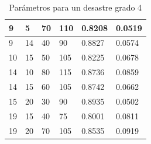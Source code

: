 \documentclass[letter, 10pt]{article}
\begin{document}
\begin{table}[H]
\begin{tabular}{|l|l|l|l|l|l|}
9 & 5 & 70 & 110 & 0.8208 & 0.0519 \\ \hline
9 & 14 & 40 & 90 & 0.8827 & 0.0574 \\ \hline
10 & 15 & 50 & 105 & 0.8225 & 0.0678 \\ \hline
14 & 10 & 80 & 115 & 0.8736 & 0.0859 \\ \hline
14 & 15 & 60 & 105 & 0.8742 & 0.0662 \\ \hline
15 & 20 & 30 & 90 & 0.8935 & 0.0502 \\ \hline
19 & 15 & 40 & 75 & 0.8001 & 0.0811 \\ \hline
19 & 20 & 70 & 105 & 0.8535 & 0.0919 \\ \hline
\end{tabular}
\caption{Parámetros para un desastre grado 4}\label{grade4}
\end{table}
\end{document}
